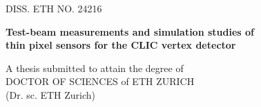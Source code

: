 
\begin{titlepage}

\newcommand{\HRule}{\rule{\linewidth}{0.5mm}} %

\center %
 

\textsc{\LARGE DISS. ETH NO. 24216}\\[1.5cm] %

\vspace{2cm}

{ \huge \bfseries Test-beam measurements and simulation studies
  of}\\%
\vspace{0.2cm} { \huge \bfseries thin pixel sensors for the CLIC vertex
  detector}\\[0.4cm] %
\vspace{2cm}

{\large A thesis submitted to attain the degree of} \\ \vspace{0.5cm}
{\Large DOCTOR OF SCIENCES of ETH ZURICH}\\ \vspace{0.3cm}
{\Large (Dr. sc. ETH Zurich)} \vspace{1.5cm}



\end{titlepage}
